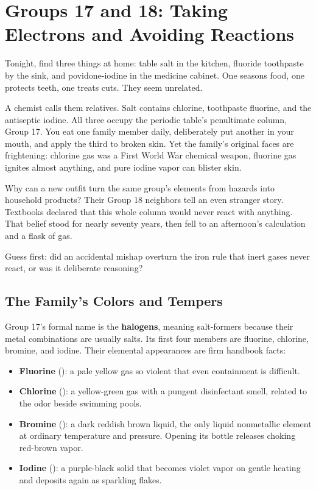 \chapter{Groups 17 and 18: Taking Electrons and Avoiding Reactions}

\begin{kaichang}
Tonight, find three things at home: table salt in the kitchen, fluoride toothpaste by the sink, and povidone-iodine in the medicine cabinet. One seasons food, one protects teeth, one treats cuts. They seem unrelated.

A chemist calls them relatives. Salt contains chlorine, toothpaste fluorine, and the antiseptic iodine. All three occupy the periodic table's penultimate column, Group 17. You eat one family member daily, deliberately put another in your mouth, and apply the third to broken skin. Yet the family's original faces are frightening: chlorine gas was a First World War chemical weapon, fluorine gas ignites almost anything, and pure iodine vapor can blister skin.

Why can a new outfit turn the same group's elements from hazards into household products? Their Group 18 neighbors tell an even stranger story. Textbooks declared that this whole column would never react with anything. That belief stood for nearly seventy years, then fell to an afternoon's calculation and a flask of gas.

Guess first: did an accidental mishap overturn the iron rule that inert gases never react, or was it deliberate reasoning?
\end{kaichang}

\section{The Family's Colors and Tempers}

Group 17's formal name is the \textbf{halogens}, meaning salt-formers because their metal combinations are usually salts. Its first four members are fluorine, chlorine, bromine, and iodine. Their elemental appearances are firm handbook facts:

\begin{itemize}[itemsep=2pt]
\item \textbf{Fluorine} (): a pale yellow gas so violent that even containment is difficult.
\item \textbf{Chlorine} (): a yellow-green gas with a pungent disinfectant smell, related to the odor beside swimming pools.
\item \textbf{Bromine} (): a dark reddish brown liquid, the only liquid nonmetallic element at ordinary temperature and pressure. Opening its bottle releases choking red-brown vapor.
\item \textbf{Iodine} (): a purple-black solid that becomes violet vapor on gentle heating and deposits again as sparkling flakes.
\end{itemize}

